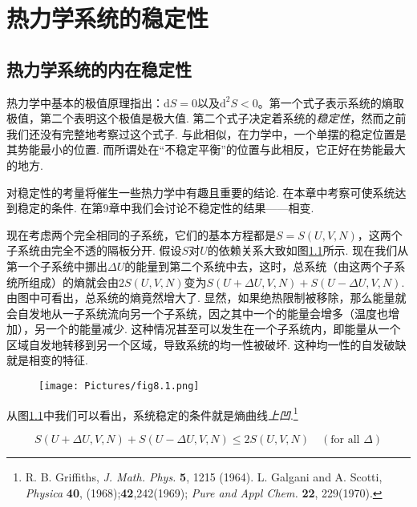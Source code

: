 

\chapter{热力学系统的稳定性}
\label{chap8}
\section{热力学系统的内在稳定性}
\label{sec8.1}
热力学中基本的极值原理指出：$\text{d}S=0$以及$\text{d}^2S<0$。第一个式子表示系统的熵取极值，第二个表明这个极值是极大值. 第二个式子决定着系统的{\it 稳定性}，然而之前我们还没有完整地考察过这个式子. 与此相似，在力学中，一个单摆的稳定位置是其势能最小的位置. 而所谓处在“不稳定平衡”的位置与此相反，它正好在势能最大的地方.

对稳定性的考量将催生一些热力学中有趣且重要的结论. 在本章中考察可使系统达到稳定的条件. 在第9章中我们会讨论不稳定性的结果——相变.

现在考虑两个完全相同的子系统，它们的基本方程都是$S=S(U,V,N)$，这两个子系统由完全不透的隔板分开. 假设$S$对$U$的依赖关系大致如图\ref{fig8.1}所示. 现在我们从第一个子系统中挪出$\Delta U$的能量到第二个系统中去，这时，总系统（由这两个子系统所组成）的熵就会由$2S(U,V,N)$变为$S(U+\Delta　U,V,N)+S(U-\Delta U,V,N)$. 由图中可看出，总系统的熵竟然增大了. 显然，如果绝热限制被移除，那么能量就会自发地从一子系统流向另一个子系统，因之其中一个的能量会增多（温度也增加），另一个的能量减少. 这种情况甚至可以发生在一个子系统内，即能量从一个区域自发地转移到另一个区域，导致系统的均一性被破坏. 这种均一性的自发破缺就是相变的特征.

\begin{figure}
\centering
\texttt{[image: Pictures/fig8.1.png]}
\label{fig8.1}
\end{figure}

从图\ref{fig8.1}中我们可以看出，系统稳定的条件就是熵曲线{\it 上凹}.\footnote{R. B. Griffiths, \textit{J. Math. Phys.} \textbf{5}, 1215 (1964). L. Galgani and A. Scotti, \textit{Physica} \textbf{40}, (1968);\textbf{42},242(1969); \textit{Pure and Appl Chem.} \textbf{22}, 229(1970).}

\begin{equation}
\label{equ8.1}
S(U+\Delta　U,V,N)+S(U-\Delta U,V,N)\leq 2S(U,V,N) \quad(\text{for all }\Delta)
\end{equation}

